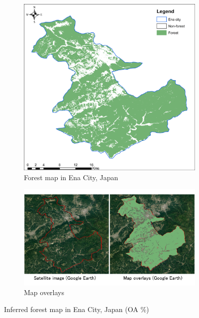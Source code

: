 \begin{figure}[p]
    \centering
    \begin{subfigure}{\textwidth}
        \centering
        \includegraphics[width=.8\textwidth]{figs/chap5/Forest.png}
        \caption{Forest map in Ena City, Japan}
        \label{fig:chap5_fig3a}
    \end{subfigure}

    \begin{subfigure}{\textwidth}
        \centering
        \includegraphics[width=.8\textwidth]{figs/chap5/satimg_overlay.png}
        \caption{Map overlays}
        \label{fig:chap5_fig3b}
    \end{subfigure}
    \caption[Inferred forest map in Ena City]{Inferred forest map in Ena City, Japan  (OA \%)}
    \label{fig:chap5_fig3}
\end{figure}

